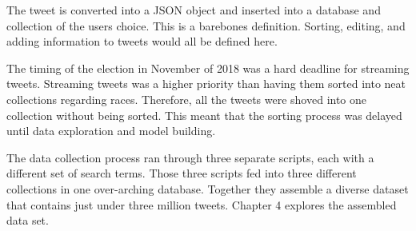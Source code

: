 \documentclass[11pt, twoside, reqno]{article}
\begin{document}
The tweet is converted into a JSON object and inserted into a database and collection of the users choice. This is a barebones definition. Sorting, editing, and adding information to tweets would all be defined here. 

The timing of the election in November of 2018 was a hard deadline for streaming tweets. Streaming tweets was a higher priority than having them sorted into neat collections regarding races. Therefore, all the tweets were shoved into one collection without being sorted. This meant that the sorting process was delayed until data exploration and model building. 

The data collection process ran through three separate scripts, each with a different set of search terms. Those three scripts fed into three different collections in one over-arching database. Together they assemble a diverse dataset that contains just under three million tweets. Chapter 4 explores the assembled data set.  
\end{document}

